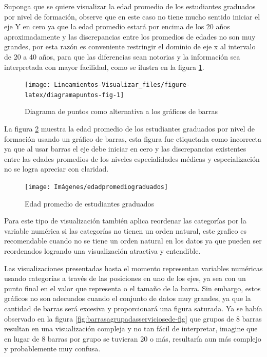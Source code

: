 \documentclass[
]{book}
\begin{document}
Suponga que se quiere visualizar la edad promedio de los estudiantes graduados por nivel de formación, observe que en este caso no tiene mucho sentido iniciar el eje Y en cero ya que la edad promedio estará por encima de los 20 años aproximadamente y las discrepancias entre los promedios de edades no son muy grandes, por esta razón es conveniente restringir el dominio de eje x al intervalo de 20 a 40 años, para que las diferencias sean notorias y la información sea interpretada con mayor facilidad, como se ilustra en la figura \ref{fig:diagramapuntos-fig}.

\begin{figure}

{\centering \texttt{[image: Lineamientos-Visualizar\_files/figure-latex/diagramapuntos-fig-1]} 

}

\caption{Diagrama de puntos como alternativa a los gráficos de barras}\label{fig:diagramapuntos-fig}
\end{figure}

La figura \ref{fig:barrasedadpromedio-fig} muestra la edad promedio de los estudiantes graduados por nivel de formación usando un gráfico de barras, esta figura fue etiquetada como incorrecta ya que al usar barras el eje debe iniciar en cero y las discrepancias existentes entre las edades promedios de los niveles especialidades médicas y especialización no se logra apreciar con claridad.

\begin{figure}

{\centering \texttt{[image: Imágenes/edadpromediograduados]} 

}

\caption{Edad promedio de estudiantes graduados}\label{fig:barrasedadpromedio-fig}
\end{figure}

Para este tipo de visualización también aplica reordenar las categorías por la variable numérica si las categorías no tienen un orden natural, este grafico es recomendable cuando no se tiene un orden natural en los datos ya que pueden ser reordenados logrando una visualización atractiva y entendible.

Las visualizaciones presentadas hasta el momento representan variables numéricas usando categorías a través de las posiciones en uno de los ejes, ya sea con un punto final en el valor que representa o el tamaño de la barra. Sin embargo, estos gráficos no son adecuados cuando el conjunto de datos muy grandes, ya que la cantidad de barras será excesiva y proporcionará una figura saturada. Ya se había observado en la figura \ref{fig:barrasagrupadasserviciosede-fig} que grupos de 8 barras resultan en una visualización compleja y no tan fácil de interpretar, imagine que en lugar de 8 barras por grupo se tuvieran 20 o más, resultaría aun más complejo y probablemente muy confusa.
\end{document}
